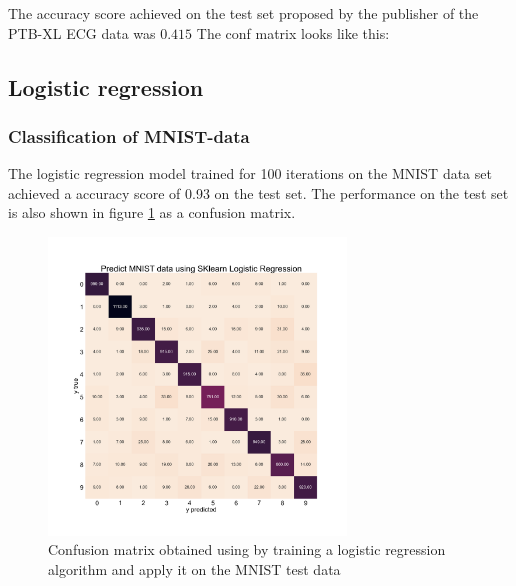\documentclass[twocolumn]{cinc}
\begin{document}
The accuracy score achieved on the test set proposed by the publisher of the PTB-XL ECG data was $0.415$
The conf matrix looks like this:

\subsection{Logistic regression}
\subsubsection{Classification of MNIST-data}
The logistic regression model trained for 100 iterations on the MNIST data set achieved a accuracy score of 0.93 on the test set. The performance on the test set is also shown in figure \ref{fig:confmatrixlog_MNIST} as a confusion matrix. 
\begin{figure}[htbp!]
\includegraphics[width=7.9cm]{Figures/MNIST_confMatrix_sklearn_logreg.png}
\caption{Confusion matrix obtained using by training a logistic regression algorithm and apply it on the MNIST test data}
\label{fig:confmatrixlog_MNIST}
\end{figure}
\end{document}

